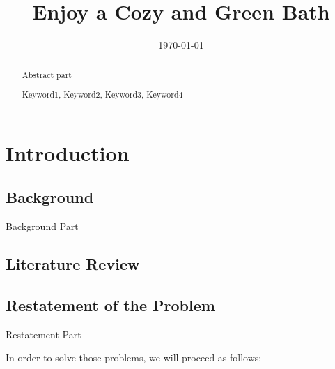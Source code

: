 \documentclass{mcmthesis}
\title{Enjoy a Cozy and Green Bath}
\date{\today}
\renewcommand{\contentsname}{\hspace*{\fill}\Large\bfseries Contents \hspace*{\fill}}	%
\begin{document}
\begin{abstract}

Abstract part

\begin{keywords}
Keyword1, Keyword2, Keyword3, Keyword4
\end{keywords}

\end{abstract}

\maketitle

\tableofcontents        %
\thispagestyle{empty}	%
\newpage

\section{Introduction}

\subsection{Background}

Background Part

\subsection{Literature Review}


\subsection{Restatement of the Problem}

Restatement Part

In order to solve those problems, we will proceed as follows:
\end{document}
